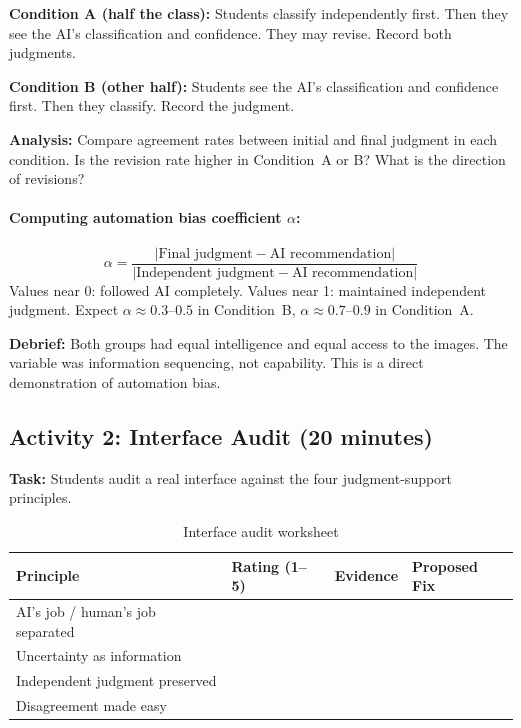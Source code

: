 \textbf{Condition A (half the class):} Students classify independently first. Then they see the AI's classification and confidence. They may revise. Record both judgments.

\textbf{Condition B (other half):} Students see the AI's classification and confidence first. Then they classify. Record the judgment.

\textbf{Analysis:} Compare agreement rates between initial and final judgment in each condition. Is the revision rate higher in Condition~A or B? What is the direction of revisions?

\paragraph{Computing automation bias coefficient $\alpha$:}
\[
\alpha = \frac{|\text{Final judgment} - \text{AI recommendation}|}{|\text{Independent judgment} - \text{AI recommendation}|}
\]
Values near 0: followed AI completely. Values near 1: maintained independent judgment. Expect $\alpha \approx 0.3$--$0.5$ in Condition~B, $\alpha \approx 0.7$--$0.9$ in Condition~A.

\textbf{Debrief:} Both groups had equal intelligence and equal access to the images. The variable was information sequencing, not capability. This is a direct demonstration of automation bias.

\subsection{Activity 2: Interface Audit (20 minutes)}

\textbf{Task:} Students audit a real interface against the four judgment-support principles.

\begin{table}[htbp]
\caption{Interface audit worksheet}
\label{tab:interface-audit-ch06}
\centering
\begin{tabular}{@{}p{4cm}p{2cm}p{4cm}p{2.5cm}@{}}
\toprule
\textbf{Principle} & \textbf{Rating (1--5)} & \textbf{Evidence} & \textbf{Proposed Fix} \\
\midrule
AI's job / human's job separated & & & \\[8pt]
Uncertainty as information & & & \\[8pt]
Independent judgment preserved & & & \\[8pt]
Disagreement made easy & & & \\
\bottomrule
\end{tabular}
\end{table}

